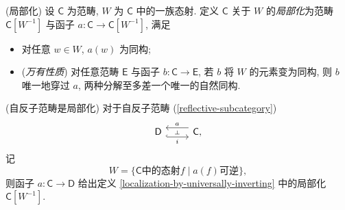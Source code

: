 \begin{definition}
	[label={localization-by-universally-inverting}]
	{(局部化)}
	设 $\mathsf C$ 为范畴, $W$ 为 $\mathsf C$ 中的一族态射.
	定义 $\mathsf C$ 关于 $W$ 的\emph{局部化}为范畴 $\mathsf C[W^{-1}]$ 与函子 $a\colon \mathsf C\to \mathsf C[W^{-1}]$,
	满足
	\begin{itemize}
		\item 对任意 $w\in W$, $a(w)$ 为同构;
		\item (\emph{万有性质}) 对任意范畴 $\mathsf E$ 与函子 $b\colon \mathsf C\to\mathsf E$, 若 $b$ 将 $W$ 的元素变为同构,
		则 $b$ 唯一地穿过 $a$, 两种分解\footnotemark{}至多差一个唯一的自然同构.
	\end{itemize}
\end{definition}


\begin{prop}
	{(自反子范畴是局部化)}
	对于自反子范畴 (\ref{reflective-subcategory}) $$
	\begin{tikzcd}[ampersand replacement=\&]
		{\mathsf D} \& {\mathsf C,}
		\arrow[""{name=0, anchor=center, inner sep=0}, "i"', shift right=2, hook, from=1-1, to=1-2]
		\arrow[""{name=1, anchor=center, inner sep=0}, "a"', shift right=2, from=1-2, to=1-1]
		\arrow["\dashv"{anchor=center, rotate=-90}, draw=none, from=1, to=0]
	\end{tikzcd}
	$$
	记
	$$
	W = \big\{
	\text{$\mathsf C$中的态射$f$} \mid \text{$a(f)$可逆}
	\big\},
	$$
	则函子 $a\colon \mathsf C\to\mathsf D$ 给出定义 \ref{localization-by-universally-inverting} 中的局部化 $\mathsf C[W^{-1}]$.
\end{prop}

